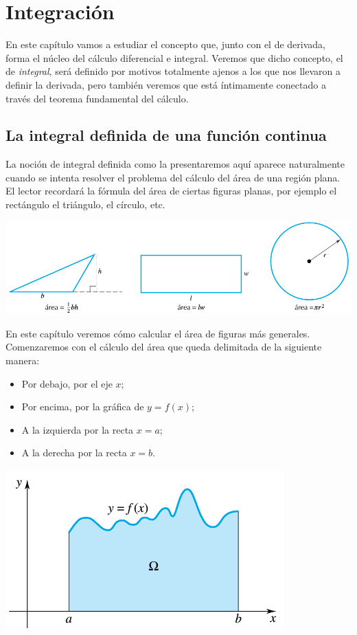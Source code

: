 
\chapter{Integración}

En este capítulo vamos a estudiar el concepto que, junto con el de derivada, forma el núcleo del cálculo diferencial e integral.
Veremos que dicho concepto, el de \emph{integral}, será definido por motivos totalmente ajenos a los que nos llevaron a definir la derivada, pero también veremos que está íntimamente conectado a través del teorema fundamental del cálculo.

\section{La integral definida de una función continua}

La noción de integral definida como la presentaremos aquí aparece naturalmente cuando se intenta resolver el problema del cálculo del área de una región plana. El lector recordará la fórmula del área de ciertas figuras planas, por ejemplo el rectángulo el triángulo, el círculo, etc.

\centerline{\includegraphics[width=.8\textwidth]{pics/areas-simples.png}}

En este capítulo veremos cómo calcular el área de figuras más generales. Comenzaremos con el cálculo del área que queda delimitada de la siguiente manera:

\noindent
\begin{minipage}{.5\textwidth}
  \begin{itemize}
  \item Por debajo, por el eje $x$;
  \item Por encima, por la gráfica de $y=f(x)$;
  \item A la izquierda por la recta $x=a$; 
  \item A la derecha por la recta $x=b$.
\end{itemize}
\end{minipage}
\begin{minipage}{.5\textwidth}
  \centering
  \includegraphics[width=.9\textwidth]{pics/area-bajo-curva.png}
\end{minipage}

